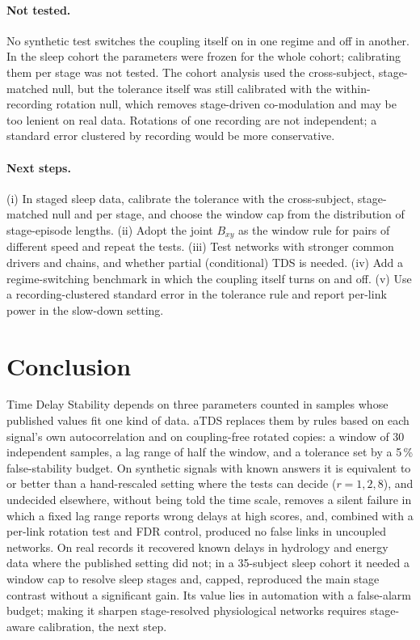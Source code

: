 \documentclass[11pt,a4paper]{article}
\begin{document}
\paragraph{Not tested.} No synthetic test switches the coupling itself on in one regime and off in another. In the sleep cohort the parameters were frozen for the whole cohort; calibrating them per stage was not tested. The cohort analysis used the cross-subject, stage-matched null, but the tolerance itself was still calibrated with the within-recording rotation null, which removes stage-driven co-modulation and may be too lenient on real data. Rotations of one recording are not independent; a standard error clustered by recording would be more conservative.

\paragraph{Next steps.} (i) In staged sleep data, calibrate the tolerance with the cross-subject, stage-matched null and per stage, and choose the window cap from the distribution of stage-episode lengths. (ii) Adopt the joint $B_{xy}$ as the window rule for pairs of different speed and repeat the tests. (iii) Test networks with stronger common drivers and chains, and whether partial (conditional) TDS is needed. (iv) Add a regime-switching benchmark in which the coupling itself turns on and off. (v) Use a recording-clustered standard error in the tolerance rule and report per-link power in the slow-down setting.

\section{Conclusion}
\label{sec:conclusion}
Time Delay Stability depends on three parameters counted in samples whose published values fit one kind of data. aTDS replaces them by rules based on each signal's own autocorrelation and on coupling-free rotated copies: a window of 30 independent samples, a lag range of half the window, and a tolerance set by a 5\,\% false-stability budget. On synthetic signals with known answers it is equivalent to or better than a hand-rescaled setting where the tests can decide ($r = 1, 2, 8$), and undecided elsewhere, without being told the time scale, removes a silent failure in which a fixed lag range reports wrong delays at high scores, and, combined with a per-link rotation test and FDR control, produced no false links in uncoupled networks. On real records it recovered known delays in hydrology and energy data where the published setting did not; in a 35-subject sleep cohort it needed a window cap to resolve sleep stages and, capped, reproduced the main stage contrast without a significant gain. Its value lies in automation with a false-alarm budget; making it sharpen stage-resolved physiological networks requires stage-aware calibration, the next step.
\end{document}

